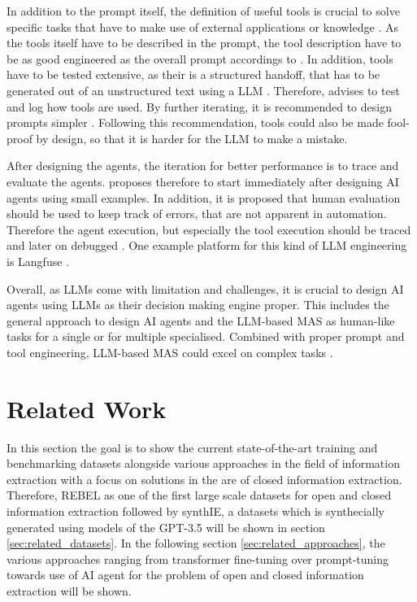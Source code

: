 \documentclass[a4paper,oneside,bibliography=totoc]{scrbook}
\begin{document}
In addition to the prompt itself, the definition of useful tools is crucial to solve specific tasks that have to make use of external applications or knowledge \cite{OpenAI2025}. As the tools itself have to be described in the prompt, the tool description have to be as good engineered as the overall prompt accordings to \citet{Anthropic2024}. In addition, tools have to be tested extensive, as their is a structured handoff, that has to be generated out of an unstructured text using a \ac{LLM} \cite{Anthropic2024}. Therefore, \citet{Anthropic2024} advises to test and log how tools are used. By further iterating, it is recommended to design prompts simpler \cite{Anthropic2024}. Following this recommendation, tools could also be made fool-proof by design, so that it is harder for the \ac{LLM} to make a mistake.

After designing the agents, the iteration for better performance is to trace and evaluate the agents. \citet{Hadfield2025} proposes therefore to start immediately after designing \ac{AI} agents using small examples. In addition, it is proposed that human evaluation should be used to keep track of errors, that are not apparent in automation. Therefore the agent execution, but especially the tool execution should be traced and later on debugged \cite{Hadfield2025}. One example platform for this kind of \ac{LLM} engineering is Langfuse \cite{Inc.2025}.

Overall, as \acp{LLM} come with limitation and challenges, it is crucial to design \ac{AI} agents using \acp{LLM} as their decision making engine proper. This includes the general approach to design \ac{AI} agents and the \ac{LLM}-based \ac{MAS} as human-like tasks for a single or for multiple specialised. Combined with proper prompt and tool engineering, \ac{LLM}-based \ac{MAS} could excel on complex tasks \cite{Hadfield2025}.

\chapter{Related Work}
\label{ch:related_work_chapter}

In this section the goal is to show the current state-of-the-art training and benchmarking datasets alongside various approaches in the field of information extraction with a focus on solutions in the are of closed information extraction. Therefore, REBEL as one of the first large scale datasets for open and closed information extraction followed by synthIE, a datasets which is synthecially generated using models of the GPT-3.5 will be shown in section \ref{sec:related_datasets}. In the following section \ref{sec:related_approaches}, the various approaches ranging from transformer fine-tuning over prompt-tuning towards use of \ac{AI} agent for the problem of open and closed information extraction will be shown.
\end{document}
